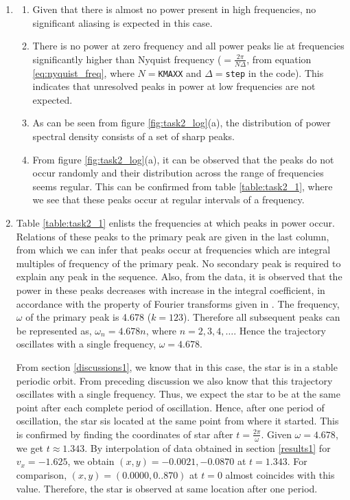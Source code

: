 \documentclass[a4paper]{article}
\begin{document}
		\begin{enumerate}
		
			\item \begin{enumerate}
				\item Given that there is almost no power present in high frequencies, no significant aliasing is expected in this case.
				\item There is no power at zero frequency and all power peaks lie at frequencies significantly higher than Nyquist frequency (\(= \frac{2 \pi}{N \Delta}\), from equation \ref{eq:nyquist_freq}, where \(N=\)\texttt{KMAXX} and \(\Delta=\)\texttt{step} in the code). This indicates that unresolved peaks in power at low frequencies are not expected.
				\item As can be seen from figure \ref{fig:task2_log}(a), the distribution of power spectral density consists of a set of sharp peaks.
				\item From figure \ref{fig:task2_log}(a), it can be observed that the peaks do not occur randomly and their distribution across the range of frequencies seems regular. This can be confirmed from table \ref{table:task2_1}, where we see that these peaks occur at regular intervals of a frequency. 
			\end{enumerate}
		
			\item Table \ref{table:task2_1} enlists the frequencies at which peaks in power occur. Relations of these peaks to the primary peak are given in the last column, from which we can infer that peaks occur at frequencies which are integral multiples of frequency of the primary peak. No secondary peak is required to explain any peak in the sequence. Also, from the data, it is observed that the power in these peaks decreases with increase in the integral coefficient, in accordance with the property of Fourier transforms given in \cite{lecture_4}. The frequency, \(\omega\) of the primary peak is 4.678 (\(k=123\)). Therefore all subsequent peaks can be represented as, \(\omega_n=4.678n\), where \(n=2, 3, 4, \dots\). Hence the trajectory oscillates with a single frequency, \(\omega = 4.678\).
			
			From section \ref{discussions1}, we know that in this case, the star is in a stable periodic orbit. From preceding discussion we also know that this trajectory oscillates with a single frequency. Thus, we expect the star to be at the same point after each complete period of oscillation. Hence, after one period of oscillation, the star sis located at the same point from where it started. This is confirmed by finding the coordinates of star after \(t=\frac{2\pi}{\omega}\). Given \(\omega=4.678\), we get \(t \approx 1.343\). By interpolation of data obtained in section \ref{results1} for \(v_x=-1.625\), we obtain \((x,y)={-0.0021,-0.0870}\) at \(t=1.343\). For comparison, \((x,y)=(0.0000,0..870)\) at \(t=0\) almost coincides with this value. Therefore, the star is observed at same location after one period. 
			

\end{enumerate}
\end{document}
